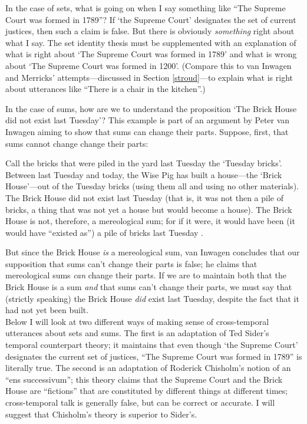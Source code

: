 \documentclass[12pt,twoside]{reedfancy}
\newenvironment{squote}{%
	\begin{spacing}{1}
	\begin{list}{}{%
	\setlength{\labelwidth}{0pt}%
	\rightmargin\leftmargin%
	}
	\item\relax
	}{%
	\end{list}%
	\end{spacing}
	}
\begin{document}
\begin{spacing}{1.25}
In the case of sets, what is going on when I say something like ``The
Supreme Court was formed in 1789''?  If `the Supreme Court' designates
the set of current justices, then such a claim is false.  But there is
obviously {\em something} right about what I say.  The set identity
thesis must be supplemented with an explanation of what is right about
`The Supreme Court was formed in 1789' and what is wrong about `The
Supreme Court was formed in 1200'.  (Compare this to van Inwagen and
Merricks' attempts---discussed in Section \ref{stroud}---to explain
what is right about utterances like ``There is a chair in the
kitchen''.)

In the case of sums, how are we to understand the proposition `The
Brick House did not exist last Tuesday'?  This example is part of an
argument by Peter van Inwagen aiming to show that sums can change
their parts.  Suppose, first, that sums cannot change change their
parts:

\begin{squote}
Call the bricks that were piled in the yard last Tuesday the `Tuesday
bricks'.  Between last Tuesday and today, the Wise Pig has built a
house---the `Brick House'---out of the Tuesday bricks (using them all
and using no other materials).  The Brick House did not exist last
Tuesday (that is, it was not then a pile of bricks, a thing that was
not yet a house but would become a house).  The Brick House is not,
therefore, a mereological sum; for if it were, it would have been (it
would have ``existed as'') a pile of bricks last Tuesday
\citeyearpar[616]{inwagen2006}.
\end{squote}

But since the Brick House {\em is} a mereological sum, van Inwagen
concludes that our supposition that sums can't change their parts is
false; he claims that mereological sums {\em can} change their parts.
If we are to maintain both that the Brick House is a sum {\em and}
that sums can't change their parts, we must say that (strictly
speaking) the Brick House {\em did} exist last Tuesday, despite the
fact that it had not yet been built. \\

Below I will look at two different ways of making sense of
cross-temporal utterances about sets and sums.  The first is an
adaptation of Ted Sider's temporal counterpart theory; it maintains
that even though `the Supreme Court' designates the current set of
justices, ``The Supreme Court was formed in 1789'' is literally true.
The second is an adaptation of Roderick Chisholm's notion of an ``ens
successivum''; this theory claims that the Supreme Court and the Brick
House are ``fictions'' that are constituted by different things at
different times; cross-temporal talk is generally false, but can be
correct or accurate.  I will suggest that Chisholm's theory is
superior to Sider's.


\end{spacing}
\end{document}
